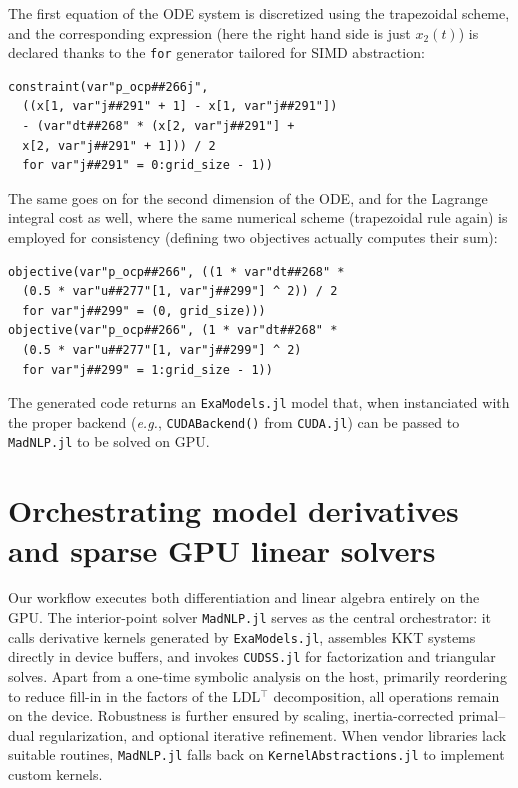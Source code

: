 \noindent The first equation of the ODE system is discretized using the trapezoidal scheme, and the corresponding expression (here the right hand side is just $x_2(t)$) is declared thanks to the \verb+for+ generator tailored for SIMD abstraction:

{\small
\begin{verbatim} 
constraint(var"p_ocp##266j",
  ((x[1, var"j##291" + 1] - x[1, var"j##291"])
  - (var"dt##268" * (x[2, var"j##291"] +
  x[2, var"j##291" + 1])) / 2
  for var"j##291" = 0:grid_size - 1))
\end{verbatim}
}

\noindent The same goes on for the second dimension of the ODE, and for the Lagrange integral cost as well, where the same numerical scheme (trapezoidal rule again) is employed for consistency (defining two objectives actually computes their sum):
 
{\small
\begin{verbatim}
objective(var"p_ocp##266", ((1 * var"dt##268" *
  (0.5 * var"u##277"[1, var"j##299"] ^ 2)) / 2
  for var"j##299" = (0, grid_size)))
objective(var"p_ocp##266", (1 * var"dt##268" *
  (0.5 * var"u##277"[1, var"j##299"] ^ 2)
  for var"j##299" = 1:grid_size - 1))
\end{verbatim}
}

\noindent The generated code returns an \texttt{ExaModels.jl} model that, when instanciated with the proper backend (\emph{e.g.}, \verb+CUDABackend()+ from \texttt{CUDA.jl}) can be passed to \texttt{MadNLP.jl} to be solved on GPU.

\section{Orchestrating model derivatives and sparse GPU linear solvers}\label{sec:orchestrate}

Our workflow executes both differentiation and linear algebra entirely on the GPU.  
The interior-point solver \texttt{MadNLP.jl} serves as the central orchestrator: it calls derivative kernels generated by \texttt{ExaModels.jl}, assembles KKT systems directly in device buffers, and invokes \texttt{CUDSS.jl} for factorization and triangular solves.  
Apart from a one-time symbolic analysis on the host, primarily reordering to reduce fill-in in the factors of the LDL$^\top$ decomposition, all operations remain on the device.
Robustness is further ensured by scaling, inertia-corrected primal–dual regularization, and optional iterative refinement.  
When vendor libraries lack suitable routines, \texttt{MadNLP.jl} falls back on \texttt{KernelAbstractions.jl} to implement custom kernels.

